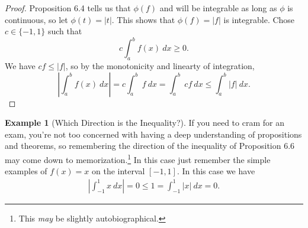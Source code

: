 \documentclass{article}
\theoremstyle{definition}
\newtheorem{example}{Example}[section]
\begin{document}
	\begin{proof}
		Proposition 6.4 tells us that $ \phi(f) $ and will be integrable as long as $ \phi $ is continuous, so let $ \phi(t)=|t| $. This shows that $ \phi(f)=|f| $ is integrable. Chose $ c\in\{-1,1\} $ such that $$c\int_{a}^{b}f(x)\ dx\ge 0 .$$ We have $ cf\le|f| $, so by the monotonicity and linearty of integration, $$\left\lvert\int_{a}^{b}f(x)\ dx\right\rvert =c\int_{a}^{b}\ f \ dx =\int_{a}^{b}\ cf\ dx \le \int_{a}^{b}|f|\ dx. $$ 
	\end{proof}
	\begin{example}[Which Direction is the Inequality?]
		If you need to cram for an exam, you're not too concerned with having a deep understanding of propositions and theorems, so remembering the direction of the inequality of Proposition 6.6 may come down to memorization.\footnote{This \textit{may} be slightly autobiographical.} In this case just remember the simple examples of $ f(x)=x $ on the interval $ [-1,1] $. In this case we have \begin{align*}
			\left\lvert\int_{-1}^{1}x\ dx \right\rvert=0\le 1=\int_{-1}^{1}|x|\ dx =0.
		\end{align*}
	\end{example}
\end{document}
